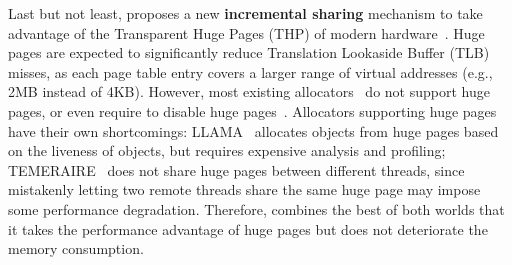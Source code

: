Last but not least, \NM{} proposes a new \textbf{incremental sharing} mechanism to take advantage of the Transparent Huge Pages (THP) of modern hardware~\cite{hugepage}. Huge pages are expected to significantly reduce Translation Lookaside Buffer (TLB) misses, as each page table entry covers a larger range of virtual addresses (e.g., 2MB instead of 4KB). However, most existing allocators~\cite{dlmalloc, Hoard, Scalloc} do not support huge pages, or even require to disable huge pages~\cite{scallochugepage}.  Allocators supporting huge pages have their own shortcomings: LLAMA~\cite{LLAMA} allocates objects from huge pages based on the liveness of objects, but requires expensive analysis and profiling; TEMERAIRE~\cite{TEMERAIRE} does not share huge pages between different threads, since mistakenly letting two remote threads share the same huge page may impose some performance degradation.  
Therefore, \NM{} combines the best of both worlds that it takes the performance advantage of huge pages but does not deteriorate the memory consumption. 


